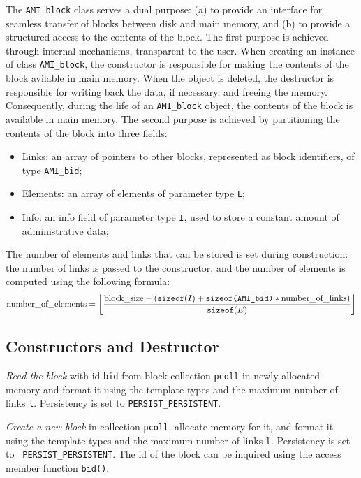 The {\tt AMI\_block} class serves a dual purpose: (a) to provide an
interface for seamless transfer of blocks between disk and main memory,
and (b) to provide a structured access to the contents of the block.
The first purpose is achieved through internal mechanisms, transparent
to the user. When creating an instance of class {\tt AMI\_block}, the
constructor is responsible for making the contents of the block
avilable in main memory. When the object is deleted, the destructor is
responsible for writing back the data, if necessary, and freeing the
memory. Consequently, during the life of an {\tt AMI\_block} object, the
contents of the block is available in main memory.
The second purpose is achieved by partitioning the contents of the block
into three fields:
\begin{itemize}
\item[] Links: an array of pointers to other blocks, represented as
block identifiers, of type {\tt AMI\_bid};
\item[] Elements: an array of elements of parameter type {\tt E};
\item[] Info: an info field of parameter type {\tt I}, used to store a 
constant amount of administrative data;
\end{itemize}

The number of elements and links that can be stored is set during
construction: the number of links is passed to the constructor, and the
number of elements is computed using the following formula:
\[\mbox{\rm number\_of\_elements} = \left\lfloor\frac{\mbox{\rm
block\_size} - (\mbox{\tt sizeof}(I) + \mbox{\tt sizeof(AMI\_bid)} *
\mbox{\rm number\_of\_links})}{\mbox{\tt sizeof}(E)}\right\rfloor \]

\subsection{Constructors and Destructor}

   \btabb 

         {{\em Read the block} with id {\tt bid} from block collection
        {\tt *pcoll} in newly allocated memory and format it using the
        template types and the maximum number of links {\tt l}. Persistency
        is set to {\tt PERSIST\_PERSISTENT}.}

         {{\em
        Create a new block} in collection {\tt *pcoll}, allocate memory for
        it, and format it using the template types and the maximum number
        of links {\tt l}. Persistency is set to {\tt
        PERSIST\_PERSISTENT}. The id of the block can be inquired using the
        access member function {\tt bid()}.}

